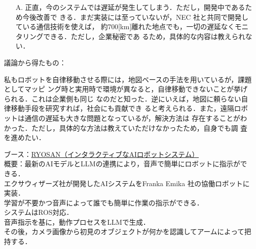 \documentclass{jsarticle}
\begin{document}
\begin{itemize}
  \item [A.]正直，今のシステムでは遅延が発生してしまう．ただし，開発中であるため今後改善で
  \hspace*{5.5zw}きる．まだ実装には至っていないが，NEC 社と共同で開発している通信技術を使えば，
  \hspace*{5.5zw}約700[km]離れた地点でも，一切の遅延なくモニタリングできる．ただし，企業秘密であ
  \hspace*{5.5zw}るため，具体的な内容は教えられない．\\
\end{itemize}

\hspace*{4.7zw}議論から得たもの：

\hspace*{5.7zw}私もロボットを自律移動させる際には，地図ベースの手法を用いているが，課題としてマッピ
\hspace*{6.7zw}ング時と実用時で環境が異なると，自律移動できないことが挙げられる．これは企業側も同じ
\hspace*{6.7zw}なのだと知った．逆にいえば，地図に頼らない自律移動手段を研究すれば，社会にも貢献でき
\hspace*{6.7zw}ると考えられる．また，遠隔ロボットは通信の遅延も大きな問題となっているが，解決方法は
\hspace*{6.7zw}存在することがわかった．ただし，具体的な方法は教えていただけなかったため，自身でも調
\hspace*{6.7zw}査を進めたい．\\


\vspace*{4mm}

\hspace*{4.7zw}ブース：\underline{RYOSAN（インタラクティブなAIロボットシステム）}\\

\hspace*{4.7zw}概要：最新のAIモデルとLLMの連携により，音声で簡単にロボットに指示ができる．\\
\hspace*{8.7zw}エクサウィザーズ社が開発したAIシステムをFranka Emika 社の協働ロボットに実装．\\
\hspace*{8.7zw}学習が不要かつ音声によって誰でも簡単に作業の指示ができる．\\
\hspace*{8.7zw}システムはROS対応．\\
\hspace*{8.7zw}音声指示を基に，動作プロセスをLLMで生成．\\
\hspace*{8.7zw}その後，カメラ画像から初見のオブジェクトが何かを認識してアームによって把持する．\\
\end{document}
